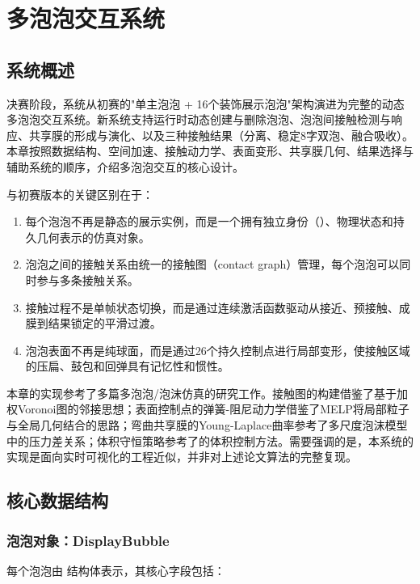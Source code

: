 
\chapter{多泡泡交互系统}

\section{系统概述}

决赛阶段，系统从初赛的"单主泡泡 + 16个装饰展示泡泡"架构演进为完整的动态多泡泡交互系统。新系统支持运行时动态创建与删除泡泡、泡泡间接触检测与响应、共享膜的形成与演化、以及三种接触结果（分离、稳定8字双泡、融合吸收）。本章按照数据结构、空间加速、接触动力学、表面变形、共享膜几何、结果选择与辅助系统的顺序，介绍多泡泡交互的核心设计。

与初赛版本的关键区别在于：
\begin{enumerate}
  \item 每个泡泡不再是静态的展示实例，而是一个拥有独立身份（）、物理状态和持久几何表示的仿真对象。
  \item 泡泡之间的接触关系由统一的接触图（contact graph）管理，每个泡泡可以同时参与多条接触关系。
  \item 接触过程不是单帧状态切换，而是通过连续激活函数驱动从接近、预接触、成膜到结果锁定的平滑过渡。
  \item 泡泡表面不再是纯球面，而是通过26个持久控制点进行局部变形，使接触区域的压扁、鼓包和回弹具有记忆性和惯性。
\end{enumerate}

本章的实现参考了多篇多泡泡/泡沫仿真的研究工作。接触图的构建借鉴了\cite{busaryev2012bubble}基于加权Voronoi图的邻接思想；表面控制点的弹簧-阻尼动力学借鉴了MELP\cite{deng2022melp}将局部粒子与全局几何结合的思路；弯曲共享膜的Young-Laplace曲率参考了多尺度泡沫模型\cite{saye2016multiscale}中的压力差关系；体积守恒策略参考了\cite{kim2007volume}的体积控制方法。需要强调的是，本系统的实现是面向实时可视化的工程近似，并非对上述论文算法的完整复现。

\section{核心数据结构}

\subsection{泡泡对象：DisplayBubble}

每个泡泡由  结构体表示，其核心字段包括：

